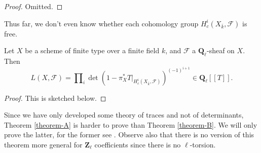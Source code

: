 \begin{proof}
Omitted.
\end{proof}

\noindent
Thus far, we don't even know whether each cohomology group
$H^i_c(X_{\bar k}, \mathcal{F})$ is free.

\begin{theorem}
\label{theorem-B}
Let $X$ be a scheme of finite type over a finite field $k$, and $\mathcal{F}$ a
$\mathbf{Q}_\ell$-sheaf on $X$. Then
$$
L(X, \mathcal{F}) =
\prod\nolimits_i
\det(1 - \pi_X^*T |_{H_c^i(X_{\bar k} , \mathcal{F})})^{(-1)^{i + 1}}
\in \mathbf{Q}_\ell[[T]].
$$
\end{theorem}

\begin{proof}
This is sketched below.
\end{proof}

\begin{remark}
\label{remark-which-is-harder}
Since we have only developed some theory of traces and not of determinants,
Theorem \ref{theorem-A}
is harder to prove than
Theorem \ref{theorem-B}.
We will only prove the latter, for the former see \cite{SGA4.5}.
Observe also that there is no version of this theorem more general for
$\mathbf{Z}_\ell$ coefficients since there is no $\ell$-torsion.
\end{remark}

